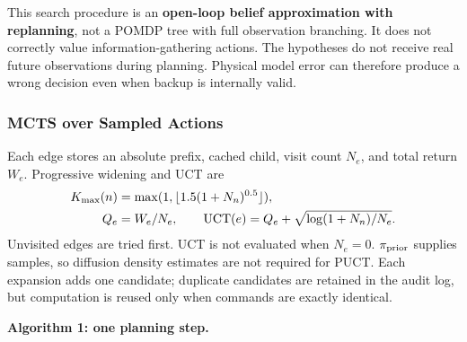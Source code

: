 \documentclass[
  10pt,
]{article}
\begin{document}
This search procedure is an \textbf{open-loop belief approximation with replanning}, not a POMDP tree with full observation branching. It does not correctly value information-gathering actions. The hypotheses do not receive real future observations during planning. Physical model error can therefore produce a wrong decision even when backup is internally valid.

\hypertarget{mcts-truxean-sampled-actions}{%
\subsubsection{MCTS over Sampled Actions}\label{mcts-truxean-sampled-actions}}

Each edge stores an absolute prefix, cached child, visit count \(N_e\), and total return \(W_e\). Progressive widening and UCT are
\begin{equation}\label{eq:uct}
\begin{aligned}
K_{\max}(n)&=\max(1,\lfloor1.5(1+N_n)^{0.5}\rfloor),\\
Q_e&=W_e/N_e,\qquad
{\rm UCT}(e)=Q_e+\sqrt{\log(1+N_n)/N_e}.
\end{aligned}
\end{equation}
Unvisited edges are tried first. UCT is not evaluated when \(N_e=0\). \(\pi_{\rm prior}\) supplies samples, so diffusion density estimates are not required for PUCT. Each expansion adds one candidate; duplicate candidates are retained in the audit log, but computation is reused only when commands are exactly identical.


\textbf{Algorithm 1: one planning step.}
\end{document}
